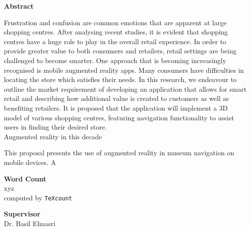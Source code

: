 \documentclass[12pt]{report}
\newcommand\blankpage{%
    \null
    \thispagestyle{empty}%
    \addtocounter{page}{-1}%
    \newpage}
\begin{document}
\begin{center}        
    \large
    \textbf{Abstract}\\
\end{center}

Frustration and confusion are common emotions that are apparent at large shopping centres. After analysing recent studies, it is evident that shopping centres have a huge role to play in the overall retail experience. In order to provide greater value to both consumers and retailers, retail settings are being challenged to become smarter. One approach that is becoming increasingly recognised is mobile augmented reality apps. Many consumers have difficulties in locating the store which satisfies their needs. In this research, we endeavour to outline the market requirement of developing an application that allows for smart retail and describing how additional value is created to customers as well as benefiting retailers. It is proposed that the application will implement a 3D model of various shopping centres, featuring navigation functionality to assist users in finding their desired store.\\

Augmented reality in this decade 

This proposal presents the use of augmented reality in museum navigation on mobile devices. A


\vspace*{1.5cm}
\begin{center}    
    \large
    \textbf{Word Count}\\
    xyz\\
    \normalsize computed by \texttt{TeXcount}
\end{center}

\vspace*{1.5cm}
\begin{center}    
    \large
    \textbf{Supervisor}\\
    \normalsize Dr. Basil Elmasri
\end{center}

\afterpage{\blankpage}


\setcounter{tocdepth}{0}
\tableofcontents

\setcounter{tocdepth}{1}
\listoffigures


\printnomenclature[1in]
\end{document}
